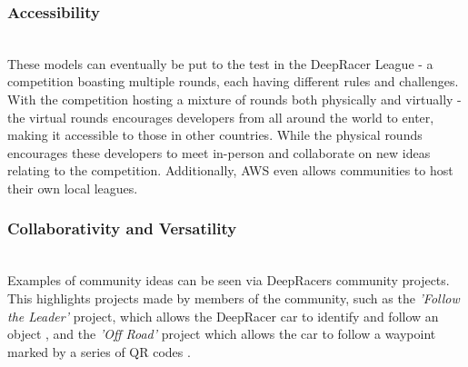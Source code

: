 \documentclass{l4proj}
\begin{document}
\subsubsection{Accessibility} \hfill \\
These models can eventually be put to the test in the DeepRacer League - a competition boasting multiple rounds, each having different rules and challenges. With the competition hosting a mixture of rounds both physically and virtually - the virtual rounds encourages developers from all around the world to enter, making it accessible to those in other countries. While the physical rounds encourages these developers to meet in-person and collaborate on new ideas relating to the competition. Additionally, AWS even allows communities to host their own local leagues.

\subsubsection{Collaborativity and Versatility} \hfill \\
Examples of community ideas can be seen via DeepRacers community projects. This highlights projects made by members of the community, such as the \textit{'Follow the Leader'} project, which allows the DeepRacer car to identify and follow an object \citep{DeepracerFollowTheLeader}, and the \textit{'Off Road'} project which allows the car to follow a waypoint marked by a series of QR codes \citep{DeepracerOffRoad}.
\end{document}
